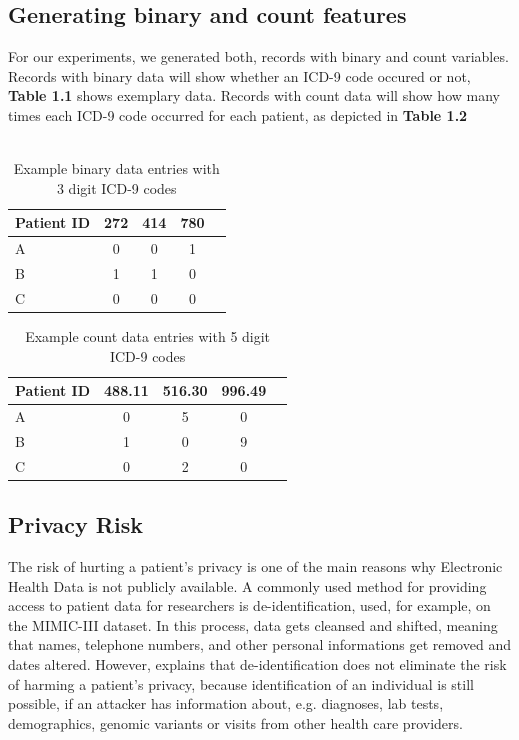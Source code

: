\documentclass[11pt, a4paper]{book}
\begin{document}
\subsection{Generating binary and count features}
For our experiments, we generated both, records with binary and count variables. Records with binary data will show whether an ICD-9 code occured or not, \textbf{Table 1.1} shows exemplary data. Records with count data will show how many times each ICD-9 code occurred for each patient, as depicted in \textbf{Table 1.2}
\\
\\

\begin{table}
\begin{center}
\begin{tabular}{l*{3}{c}r }
Patient ID & 272 & 414 & 780 \\
\hline
A & 0 & 0 & 1 \\
B & 1 & 1 & 0 \\
C & 0 & 0 & 0 \\
\hline
\end{tabular}
\caption{Example binary data entries with 3 digit ICD-9 codes}
\label{tab:example-binary}
\end{center}
\end{table}


\begin{table}
\begin{center}
\begin{tabular}{l*{3}{c}r }
Patient ID & 488.11 & 516.30 & 996.49 \\
\hline
A & 0 & 5 & 0 \\
B & 1 & 0 & 9 \\
C & 0 & 2 & 0 \\
\hline
\end{tabular}
\caption{Example count data entries with 5 digit ICD-9 codes}
\label{tab:example-count}
\end{center}
\end{table}

\subsection{Privacy Risk}
The risk of hurting a patient's privacy is one of the main reasons why Electronic Health Data is not publicly available. A commonly used method for providing access to patient data for researchers is de-identification, used, for example, on the MIMIC-III dataset. In this process, data gets cleansed and shifted, meaning that names, telephone numbers, and other personal informations get removed and dates altered. \cite{johnson2016mimic}
However, \cite{Choi2017} explains that de-identification does not eliminate the risk of harming a patient's privacy, because identification of an individual is still possible, if an attacker has information about, e.g. diagnoses, lab tests, demographics, genomic variants or visits from other health care providers.
\end{document}
